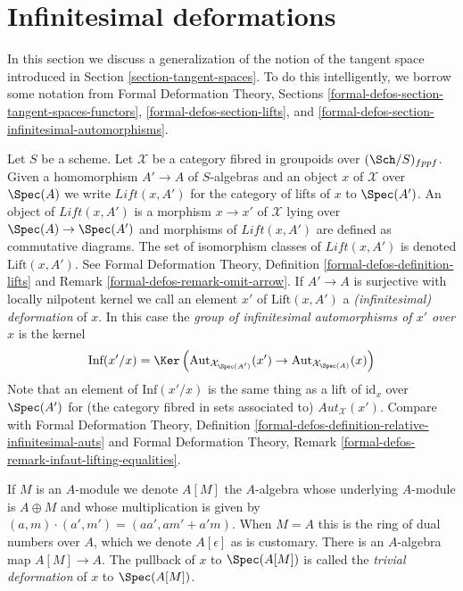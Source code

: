 \section{Infinitesimal deformations}
\label{section-inf}

\noindent
In this section we discuss a generalization of the notion of the
tangent space introduced in Section \ref{section-tangent-spaces}.
To do this intelligently, we borrow some notation from
Formal Deformation Theory, Sections
\ref{formal-defos-section-tangent-spaces-functors},
\ref{formal-defos-section-lifts}, and
\ref{formal-defos-section-infinitesimal-automorphisms}.

\medskip\noindent
Let $S$ be a scheme. Let $\mathcal{X}$ be a category fibred in groupoids
over $(\Sch/S)_{fppf}$. Given a homomorphism $A' \to A$ of $S$-algebras
and an object $x$ of $\mathcal{X}$ over $\Spec(A)$ we write
$\textit{Lift}(x, A')$ for the category of lifts of $x$ to $\Spec(A')$.
An object of $\textit{Lift}(x, A')$ is a morphism $x \to x'$ of $\mathcal{X}$
lying over $\Spec(A) \to \Spec(A')$ and morphisms of $\textit{Lift}(x, A')$
are defined as commutative diagrams. The set of isomorphism classes of
$\textit{Lift}(x, A')$ is denoted $\text{Lift}(x, A')$. See
Formal Deformation Theory, Definition \ref{formal-defos-definition-lifts} and
Remark \ref{formal-defos-remark-omit-arrow}.
If $A' \to A$ is surjective with locally nilpotent kernel we call an element
$x'$ of $\text{Lift}(x, A')$ a {\it (infinitesimal) deformation} of $x$.
In this case the {\it group of infinitesimal automorphisms of $x'$ over $x$}
is the kernel
$$
\text{Inf}(x'/x) =
\Ker\left(
\text{Aut}_{\mathcal{X}_{\Spec(A')}}(x') \to
\text{Aut}_{\mathcal{X}_{\Spec(A)}}(x)\right)
$$
Note that an element of $\text{Inf}(x'/x)$ is the same thing as a lift
of $\text{id}_x$ over $\Spec(A')$ for (the category fibred in sets associated
to) $\mathit{Aut}_\mathcal{X}(x')$. Compare with
Formal Deformation Theory, Definition
\ref{formal-defos-definition-relative-infinitesimal-auts} and
Formal Deformation Theory, Remark
\ref{formal-defos-remark-infaut-lifting-equalities}.

\medskip\noindent
If $M$ is an $A$-module we denote $A[M]$ the $A$-algebra whose underlying
$A$-module is $A \oplus M$ and whose multiplication is given by
$(a, m) \cdot (a', m') = (aa', am' + a'm)$. When $M = A$ this is the ring
of dual numbers over $A$, which we denote $A[\epsilon]$ as is customary.
There is an $A$-algebra map $A[M] \to A$. The pullback of $x$ to $\Spec(A[M])$
is called the {\it trivial deformation} of $x$ to $\Spec(A[M])$.

